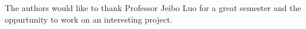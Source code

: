 \begin{acks}
The authors would like to thank Professor Jeibo Luo for a great semester and the oppurtunity to work on an interesting project.

\end{acks}



